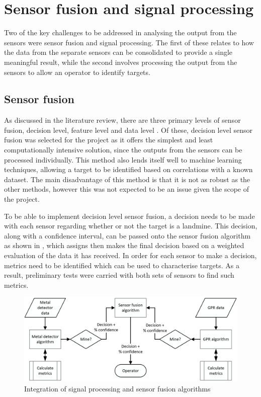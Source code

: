 \documentclass[main.tex]{subfiles}
\begin{document}
\section{Sensor fusion and signal processing}
Two of the key challenges to be addressed in analysing the output from the sensors were sensor fusion and signal processing. The first of these relates to how the data from the separate sensors can be consolidated to provide a single meaningful result, while the second involves processing the output from the sensors to allow an operator to identify targets. 

\subsection{Sensor fusion}
As discussed in the literature review, there are three primary levels of sensor fusion, decision level, feature level and data level \parencite{Yarovoy2009}. Of these, decision level sensor fusion was selected for the project as it offers the simplest and least computationally intensive solution, since the outputs from the sensors can be processed individually. This method also lends itself well to machine learning techniques, allowing a target to be identified based on correlations with a known dataset. The main disadvantage of this method is that it is not as robust as the other methods, however this was not expected to be an issue given the scope of the project. 

To be able to implement decision level sensor fusion, a decision needs to be made with each sensor regarding whether or not the target is a landmine. This decision, along with a confidence interval, can be passed onto the sensor fusion algorithm as shown in , which assigns then makes the final decision based on a weighted evaluation of the data it has received. In order for each sensor to make a decision, metrics need to be identified which can be used to characterise targets. As a result, preliminary tests were carried with both sets of sensors to find such metrics.

\begin{figure}[ht]
\includegraphics[width=\textwidth]{3-ConceptDesign/fusion.PNG}
\centering
\caption{Integration of signal processing and sensor fusion algorithms} 
\end{figure}
\end{document}
